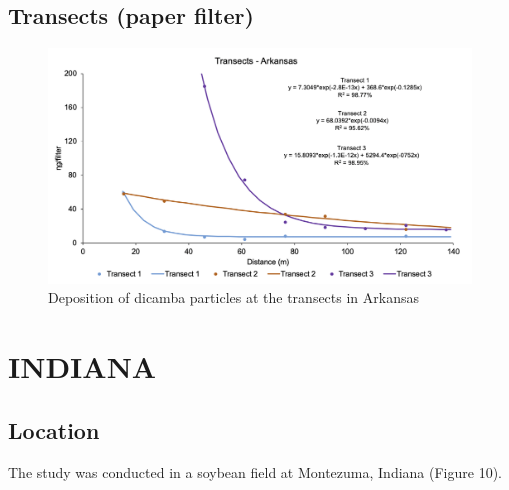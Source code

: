\documentclass[]{article}
\begin{document}
\newpage

\subsection{Transects (paper filter)}\label{transects-paper-filter}

\begin{figure}[h]

{\centering \includegraphics[width=1\linewidth]{ARtransect} 

}

\caption{Deposition of dicamba particles at the transects in Arkansas}\label{fig:unnamed-chunk-23}
\end{figure}

\newpage

\pagebreak

\section{INDIANA}\label{indiana-1}

\subsection{Location}\label{location-1}

The study was conducted in a soybean field at Montezuma, Indiana (Figure
10).
\end{document}

